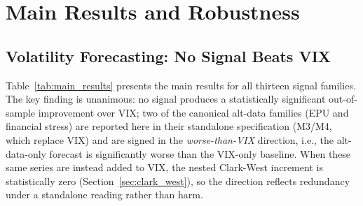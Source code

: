 \documentclass[12pt,a4paper]{article}
\begin{document}
\section{Main Results and Robustness}
\label{sec:results}

\subsection{Volatility Forecasting: No Signal Beats VIX}

Table~\ref{tab:main_results} presents the main results for all thirteen signal families. The key finding is unanimous: no signal produces a statistically significant out-of-sample improvement over VIX; two of the canonical alt-data families (EPU and financial stress) are reported here in their standalone specification (M3/M4, which replace VIX) and are signed in the \emph{worse-than-VIX} direction, i.e., the alt-data-only forecast is significantly worse than the VIX-only baseline. When these same series are instead added to VIX, the nested Clark-West increment is statistically zero (Section~\ref{sec:clark_west}), so the direction reflects redundancy under a standalone reading rather than harm.
\end{document}
